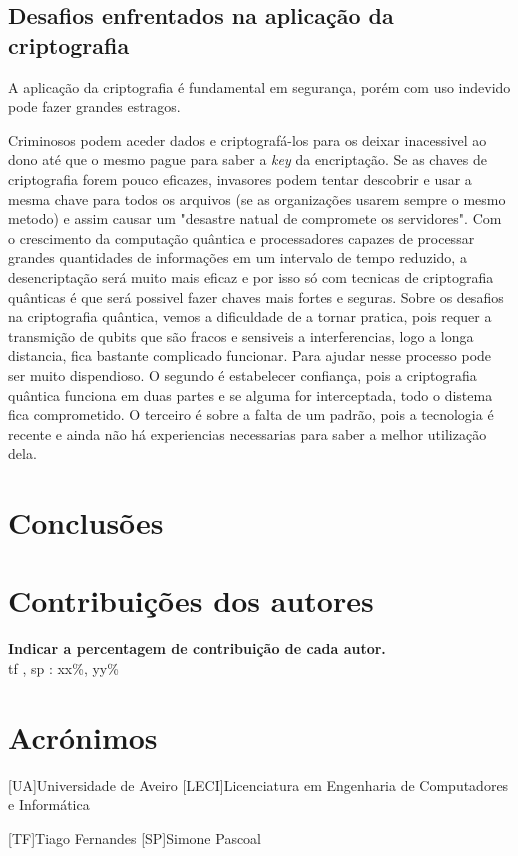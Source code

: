 \documentclass{report}
\begin{document}
\section{Desafios enfrentados na aplicação da criptografia}

A aplicação da criptografia é fundamental em segurança, porém com uso indevido pode fazer grandes estragos. 

Criminosos podem aceder dados e criptografá-los para os deixar inacessivel ao dono até que o mesmo pague para saber a \textit{key} da encriptação.
Se as chaves de criptografia forem pouco eficazes, invasores podem tentar descobrir e usar a mesma chave para todos os arquivos (se as organizações usarem sempre o mesmo metodo) e assim causar um "desastre natual de compromete os servidores". Com o crescimento da computação quântica e processadores capazes de processar grandes quantidades de informações em um intervalo de tempo reduzido, a desencriptação será muito mais eficaz e por isso só com tecnicas de criptografia quânticas é que será possivel fazer chaves mais fortes e seguras.\cite{google}
Sobre os desafios na criptografia quântica, vemos a dificuldade de a tornar pratica, pois requer a transmição de qubits que são fracos e sensiveis a interferencias, logo a longa distancia, fica bastante complicado funcionar. Para ajudar nesse processo pode ser muito dispendioso. O segundo é estabelecer confiança, pois a criptografia quântica funciona em duas partes e se alguma for interceptada, todo o distema fica comprometido. O terceiro é sobre a falta de um padrão, pois a tecnologia é recente e ainda não há experiencias necessarias para saber a melhor utilização dela.






\chapter{Conclusões}
\label{chap.conclusao}



\chapter*{Contribuições dos autores}



\vspace{10pt}
\textbf{Indicar a percentagem de contribuição de cada autor.}\\


\ac{tf} , \ac{sp} : xx\%, yy\%\\

\chapter*{Acrónimos}
\begin{acronym}[UA]{Universidade de Aveiro}
[LECI]{Licenciatura em Engenharia de Computadores e Informática}

[TF]{Tiago Fernandes}
[SP]{Simone Pascoal}

\end{acronym}


\printbibliography
\end{document}
